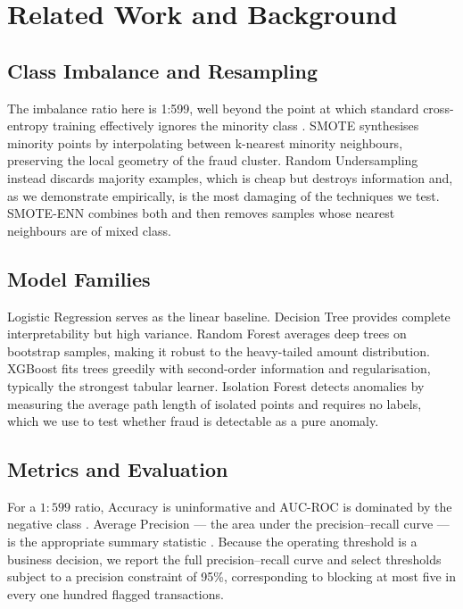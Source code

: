 \section{Related Work and Background}
\label{sec:background}

\subsection{Class Imbalance and Resampling}

The imbalance ratio here is 1:599, well beyond the point at which standard
cross-entropy training effectively ignores the minority class \cite{Guo2008}.
SMOTE \cite{Chawla2002} synthesises minority points by interpolating between
k-nearest minority neighbours, preserving the local geometry of the fraud
cluster. Random Undersampling instead discards majority examples, which is cheap
but destroys information and, as we demonstrate empirically, is the most
damaging of the techniques we test. SMOTE-ENN combines both and then removes
samples whose nearest neighbours are of mixed class.

\subsection{Model Families}

Logistic Regression serves as the linear baseline. Decision Tree provides
complete interpretability but high variance. Random Forest \cite{Breiman2001}
averages deep trees on bootstrap samples, making it robust to the heavy-tailed
amount distribution. XGBoost \cite{Jian2013} fits trees greedily with second-order
information and regularisation, typically the strongest tabular learner.
Isolation Forest detects anomalies by measuring the average path length of
isolated points and requires no labels, which we use to test whether fraud is
detectable as a pure anomaly.

\subsection{Metrics and Evaluation}

For a $1:599$ ratio, Accuracy is uninformative and AUC-ROC is dominated by the
negative class \cite{Fawcett2006}. Average Precision --- the area under the
precision--recall curve --- is the appropriate summary statistic
\cite{Davis2006}. Because the operating threshold is a business decision, we
report the full precision--recall curve and select thresholds subject to a
precision constraint of 95\%, corresponding to blocking at most five in every
one hundred flagged transactions.

